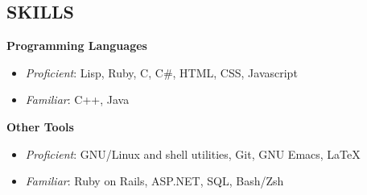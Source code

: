 \documentclass[line,margin]{res}
\begin{document}
\begin{resume}




  \section{SKILLS}
  {\bf\rmfamily Programming Languages}
  \begin{itemize} \itemsep -2pt
  \item \emph{Proficient}: Lisp, Ruby, C, C\#, HTML, CSS, Javascript
  \item \emph{Familiar}: C++, Java
  \end{itemize}

  {\bf\rmfamily Other Tools}
  \begin{itemize} \itemsep -2pt
  \item \emph{Proficient}: GNU/Linux and shell utilities, Git, GNU Emacs, \LaTeX
  \item \emph{Familiar}: Ruby on Rails, ASP.NET, SQL, Bash/Zsh
  \end{itemize}




\end{resume}
\end{document}
